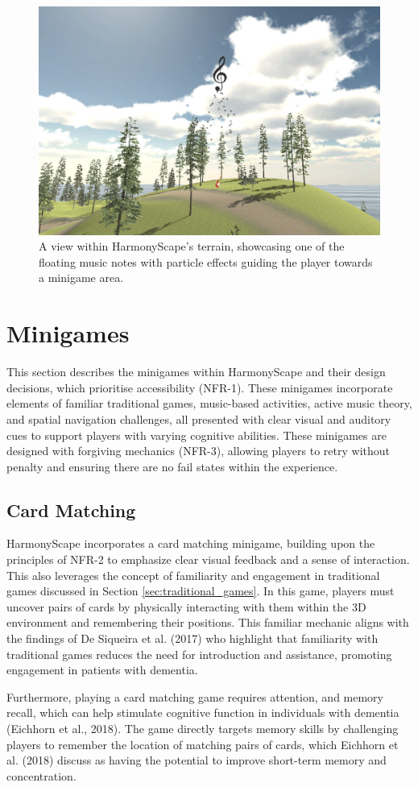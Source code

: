 \documentclass{l4proj}
\begin{document}
\begin{figure}[h]
    \centering
    \includegraphics[width=0.5\linewidth]{dissertation/images/floating_notes.png} 
    \caption{A view within HarmonyScape's terrain, showcasing one of the floating music notes with particle effects guiding the player towards a minigame area. }
    \label{fig:floating_notes} 
\end{figure}

\section{Minigames}
This section describes the minigames within HarmonyScape and their design decisions, which prioritise accessibility (NFR-1). These minigames incorporate elements of familiar traditional games, music-based activities, active music theory, and spatial navigation challenges, all presented with clear visual and auditory cues to support players with varying cognitive abilities. These minigames are designed with forgiving mechanics (NFR-3), allowing players to retry without penalty and ensuring there are no fail states within the experience.

\subsection{Card Matching}
HarmonyScape incorporates a card matching minigame, building upon the principles of NFR-2 to emphasize clear visual feedback and a sense of interaction. This also leverages the concept of familiarity and engagement in traditional games discussed in Section \ref{sec:traditional_games}. In this game, players must uncover pairs of cards by physically interacting with them within the 3D environment and remembering their positions. This familiar mechanic aligns with the findings of De Siqueira et al. (2017) who highlight that familiarity with traditional games reduces the need for introduction and assistance, promoting engagement in patients with dementia.

Furthermore, playing a card matching game requires attention, and memory recall, which can help stimulate cognitive function in individuals with dementia (Eichhorn et al., 2018). The game directly targets memory skills by challenging players to remember the location of matching pairs of cards, which Eichhorn et al. (2018) discuss as having the potential to improve short-term memory and concentration.
\end{document}
